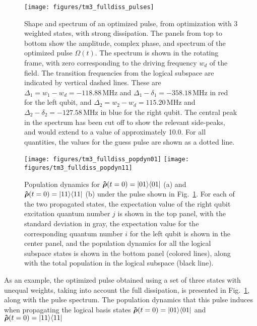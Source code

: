 \begin{figure}[tbp] %
  \centering
  \texttt{[image: figures/tm3\_fulldiss\_pulses]}
  \caption{Shape and spectrum of an optimized pulse, from optimization with
    3 weighted states, with strong dissipation. The panels from top to bottom show the
    amplitude, complex phase, and spectrum of the optimized
    pulse $\Omega(t)$.  The spectrum is shown in the rotating frame, with
    zero corresponding to the driving frequency $w_d$ of the field. The
    transition frequencies from the logical subspace are indicated by
    vertical dashed lines.
    These are $\Delta_1 = w_1 - w_d = -118.88\,$MHz and
    $\Delta_1 - \delta_1 = -358.18\,$MHz in red for the left qubit, and
    $\Delta_2 = w_2 - w_d = 115.20\,$MHz and
    $\Delta_2 - \delta_2 = -127.58\,$MHz in blue for the right qubit.
    The central peak in the spectrum has been cut off to show the
    relevant side-peaks, and would extend to a value of approximately
    10.0.  For all quantities, the values for the guess pulse are shown
    as a dotted line.
  }
  \label{fig:tm3_fulldiss_pulses}
\end{figure}
\begin{figure}[tb] %
  \centering
  \texttt{[image: figures/tm3\_fulldiss\_popdyn01]}
  \texttt{[image: figures/tm3\_fulldiss\_popdyn11]}
  \caption{Population dynamics for
          $\boldsymbol{\mathsf{\hat{\rho}}}(t=0) = \left\vert 01 \right\rangle\!\left\langle 01 \right\vert$ (a) and
          $\boldsymbol{\mathsf{\hat{\rho}}}(t=0) = \left\vert 11 \right\rangle\!\left\langle 11 \right\vert$ (b) under the
          pulse shown in Fig.~\ref{fig:tm3_fulldiss_pulses}. For each of the two
          propagated states, the expectation value of the right qubit excitation
          quantum number $j$ is shown in the top panel, with the standard
          deviation in gray, the expectation value for the corresponding quantum
          number $i$ for the left qubit is shown in the center panel, and the
          population dynamics for all the logical subspace states is shown in
          the bottom panel (colored lines), along with the total population in
          the logical subspace (black line).}
  \label{fig:tm3_fulldiss_popdyn}
\end{figure}
As an example, the optimized pulse obtained using a set of  three
states with unequal weights, taking into account the full dissipation,
is presented in
Fig.~\ref{fig:tm3_fulldiss_pulses}, along with the pulse spectrum. The population
dynamics that this pulse induces when propagating the logical basis states
$\boldsymbol{\mathsf{\hat{\rho}}}(t=0) = \left\vert 01 \right\rangle\!\left\langle 01 \right\vert$ and  $\boldsymbol{\mathsf{\hat{\rho}}}(t=0) = \left\vert 11 \right\rangle\!\left\langle 11 \right\vert$
